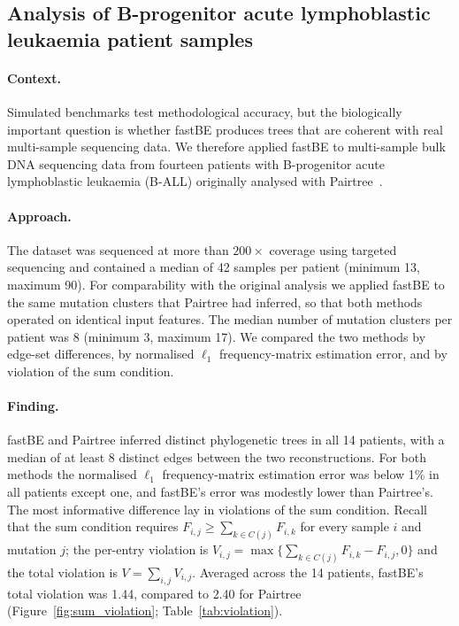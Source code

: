\documentclass[11pt]{article}
\begin{document}
\subsection{Analysis of B-progenitor acute lymphoblastic leukaemia patient samples}

\paragraph{Context.}
Simulated benchmarks test methodological accuracy, but the biologically important question is whether fastBE produces trees that are coherent with real multi-sample sequencing data. We therefore applied fastBE to multi-sample bulk DNA sequencing data from fourteen patients with B-progenitor acute lymphoblastic leukaemia (B-ALL) originally analysed with Pairtree~\citep{wintersinger2022pairtree}.

\paragraph{Approach.}
The dataset was sequenced at more than $200\times$ coverage using targeted sequencing and contained a median of 42 samples per patient (minimum 13, maximum 90). For comparability with the original analysis we applied fastBE to the same mutation clusters that Pairtree had inferred, so that both methods operated on identical input features. The median number of mutation clusters per patient was 8 (minimum 3, maximum 17). We compared the two methods by edge-set differences, by normalised $\ell_1$ frequency-matrix estimation error, and by violation of the sum condition.

\paragraph{Finding.}
fastBE and Pairtree inferred distinct phylogenetic trees in all 14 patients, with a median of at least 8 distinct edges between the two reconstructions. For both methods the normalised $\ell_1$ frequency-matrix estimation error was below 1\% in all patients except one, and fastBE's error was modestly lower than Pairtree's. The most informative difference lay in violations of the sum condition. Recall that the sum condition requires $F_{i,j}\geq \sum_{k\in C(j)} F_{i,k}$ for every sample $i$ and mutation $j$; the per-entry violation is $V_{i,j}=\max\{\sum_{k\in C(j)} F_{i,k} - F_{i,j}, 0\}$ and the total violation is $V = \sum_{i,j} V_{i,j}$. Averaged across the 14 patients, fastBE's total violation was 1.44, compared to 2.40 for Pairtree (Figure~\ref{fig:sum_violation}; Table~\ref{tab:violation}).
\end{document}
